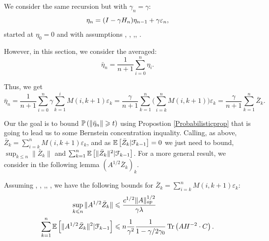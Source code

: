 We consider the same recursion but with $\gamma_n = \gamma$:
$$
\eta_n = ( \idm - \gamma H_n) \eta_{n-1} + \gamma \varepsilon_n,
$$
started at  $\eta_0=0$ and with assumptions , , ,, .

However, in this section, we consider the averaged: 
$$
\bar{\eta}_n = \frac{1}{n+1} \sum_{i=0}^n \eta_i.
$$

Thus, we get
$$
\bar{\eta}_n = \frac{1}{n+1} \sum_{i=0}^n \gamma \sum_{k=1}^i M(i,k+1) \varepsilon_k
= \frac{\gamma}{n+1} 
 \sum_{k=1}^n \Big( \sum_{i=k}^n M(i,k+1) \Big) \varepsilon_k
 = \frac{\gamma}{n+1}  \sum_{k=1}^n \bar{Z}_k.
 $$

Our the goal is to bound $\displaystyle\P \left( \left\| \bar{\eta}_n  \right\| \geqslant t \right) $ using Propostion \ref{Probabilisticprop} that is going to lead us to some Bernstein concentration inquality. Calling, as above, $\displaystyle \bar{Z}_k =  \sum_{i=k}^n M(i,k+1) \varepsilon_k$, and as $\E \left[ \bar{Z}_k | \mathcal{F}_{k-1} \right] = 0$ we just need to bound, $\sup_{k \leqslant n} \| \bar{Z}_k \|$ and $\sum_{k = 1}^n \E \left[ \|\bar{Z}_k\|^2 | \mathcal{F}_{k-1} \right] $. For a more general result, we consider in the following lemma $\displaystyle (A^{1/2}\bar{Z}_k)_k$.

\begin{lemma}
\label{le:averagebounds}
Assuming , , ,, , we have the following bounds for $\displaystyle \bar{Z}_k =  \sum_{i=k}^n M(i,k+1) \varepsilon_k$: 
\begin{align}
\sup_{k \leqslant n} \| A^{1/2} \bar{Z}_k \| &\leqslant \frac{c^{1/2} \|A\|_{op}^{1/2} }{\gamma \lambda} \\
\sum_{k = 1}^n \E \left[ \|A^{1/2} \bar{Z}_k\|^2 | \mathcal{F}_{k-1} \right] &\leqslant n \frac{1}{\gamma^2}\frac{1}{1-\gamma/2\gamma_0} \tr \left(A H^{-2}\cdot C \right).
\end{align}

\end{lemma}

